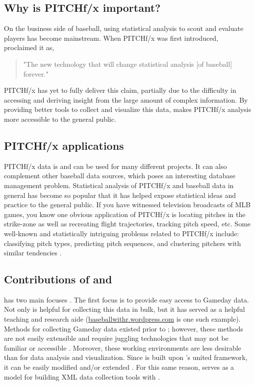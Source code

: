 \begin{article}
\subsection{Why is PITCHf/x important?}

On the business side of baseball, using statistical analysis to scout
and evaluate players has become mainstream. When PITCHf/x was first
introduced, \citep{slate} proclaimed it as, \begin{quote} "The new technology that will change statistical analysis [of baseball] forever." \end{quote}
PITCHf/x has yet to fully deliver this claim, partially due to the
difficulty in accessing and deriving insight from the large amount
of complex information. By providing better tools to collect and visualize
this data,  makes PITCHf/x analysis more accessible
to the general public.


\subsection{PITCHf/x applications}

PITCHf/x data is and can be used for many different projects. It can
also complement other baseball data sources, which poses an interesting
database management problem. Statistical analysis of PITCHf/x and
baseball data in general has become so popular that it has helped
expose statistical ideas and practice to the general public. If you
have witnessed television broadcasts of MLB games, you know one obvious
application of PITCHf/x is locating pitches in the strike-zone as
well as recreating flight trajectories, tracking pitch speed, etc.
Some well-known and statistically intriguing problems related to PITCHf/x
include: classifying pitch types, predicting pitch sequences, and
clustering pitchers with similar tendencies \citet{curve}.


\subsection{Contributions of  and }

 has two main focuses \citet{pitchRx}. The first focus
is to provide easy access to Gameday data. Not only is 
helpful for collecting this data in bulk, but it has served as a helpful
teaching and research aide (\href{http://baseballwithr.wordpress.com/}{baseballwithr.wordpress.com}
is one such example). Methods for collecting Gameday data existed
prior to ; however, these methods are not easily extensible
and require juggling technologies that may not be familiar or accessible
\citet{database}. Moreover, these working environments are less desirable
than  for data analysis and visualization. Since 
is built upon 's united framework, it can be easily modified
and/or extended \citet{XML2R}. For this same reason, 
serves as a model for building XML data collection tools with .


\end{article}
